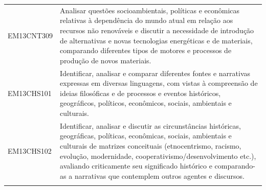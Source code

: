\documentclass[12pt]{extarticle}
\begin{document}
\begin{longtable}{ll}
EM13CNT309 & Analisar questões socioambientais, políticas e econômicas relativas à dependência do mundo atual em relação aos recursos não renováveis e discutir a necessidade de introdução de alternativas e novas tecnologias energéticas e de materiais, comparando diferentes tipos de motores e processos de produção de novos materiais.                                                                                                                                                                                                                                                                                                                                                                                                                                                                                     \\
\rowcolor[HTML]{E0F7FA} 
EM13CHS101 & Identificar, analisar e comparar diferentes fontes e narrativas expressas em diversas linguagens, com vistas à compreensão de ideias filosóficas e de processos e eventos históricos, geográficos, políticos, econômicos, sociais, ambientais e culturais.                                                                                                                                                                                                                                                                                                                                                                                                                                                                                                                                                            \\
\rowcolor[HTML]{FFF} 
EM13CHS102 & Identificar, analisar e discutir as circunstâncias históricas, geográficas, políticas, econômicas, sociais, ambientais e culturais de matrizes conceituais (etnocentrismo, racismo, evolução, modernidade, cooperativismo/desenvolvimento etc.), avaliando criticamente seu significado histórico e comparando-as a narrativas que contemplem outros agentes e discursos.                                                                                                                                                                                                                                                                                                                                                                                                                                             \\
\rowcolor[HTML]{E0F7FA} 

\end{longtable}
\end{document}
